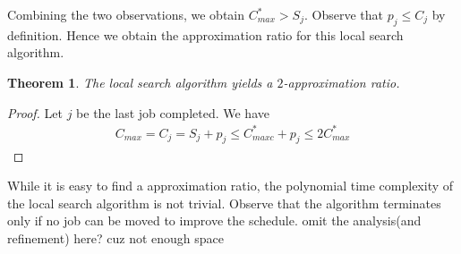 \documentclass[11pt,psfig,times]{article}
\newtheorem{theorem}{Theorem}
\begin{document}
Combining the two observations, we obtain $C_{max}^* > S_j$. Observe that $p_j \leq C_j$ by definition. 
Hence we obtain the approximation ratio for this local search algorithm.
\begin{theorem}
    \label{theorem:localsearch}
    The local search algorithm yields a $2$-approximation ratio.
\end{theorem}
\begin{proof}
    Let $j$ be the last job completed. We have
    \begin{align*}
        C_{max} = C_j = S_j + p_j \leq C_{maxc}^* + p_j \leq 2C_{max}^*
    \end{align*}
\end{proof}
While it is easy to find a approximation ratio, the polynomial time complexity of the local search algorithm 
is not trivial. Observe that the algorithm terminates only if no job can be moved to improve the schedule. 
\color{red} omit the analysis(and refinement) here? cuz not enough space \color{black} 
\end{document}
